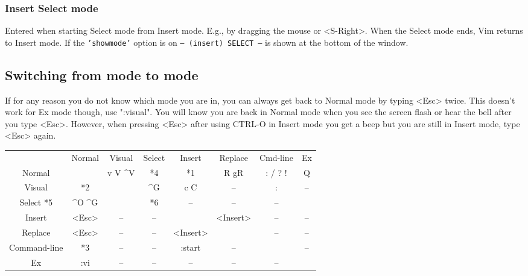 \subsubsection{Insert Select mode}
Entered when starting Select mode from Insert mode.
E.g., by dragging the mouse or <S-Right>.
When the Select mode ends, Vim returns to Insert mode.
If the \texttt{'showmode'} option is on \texttt{-- (insert) SELECT --}
is shown at the bottom of the window.

\subsection{Switching from mode to mode}
\label{mode-switching}

If for any reason you do not know which mode you are in, you can always get back to Normal mode by typing <Esc> twice.
This doesn't work for Ex mode though, use ":visual".
You will know you are back in Normal mode when you see the screen flash or hear the bell after you type <Esc>.
However, when pressing <Esc> after using CTRL-O in Insert mode you get a beep but you are still in Insert mode, type <Esc> again.

\label{i_esc}
\begin{tabular}{c c c c c c c c}
				\backslashbox{FROM mode}{TO mode} & Normal & Visual                & Select & Insert   & Replace  & Cmd-line & Ex \\
				Normal                        &        & v       V       \textasciicircum V    & *4     & *1       & R gR     & : / ? !  & Q\\
				Visual                        & *2     &                       & \textasciicircum G     & c      C & --       & :        & --\\
				Select           *5     & \textasciicircum O                 \textasciicircum G &        & *6       & --       & --       & --\\
				Insert                            & <Esc>  & --                    & --     &          & <Insert> & --       & --\\
				Replace                           & <Esc>  & --                    & --     & <Insert> &          & --       & --\\
				Command-line                      & *3     & --                    & --     & :start   & --       &          & --\\
				Ex                                & :vi    & --                    & --     & --       & --       & --       & \\
\end{tabular}

